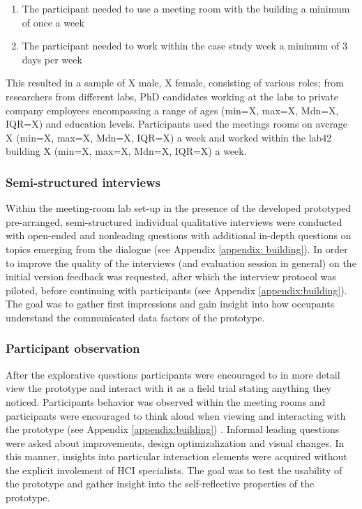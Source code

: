 \begin{enumerate}
    \renewcommand{\labelenumi}{C\arabic{enumi}:}
    \item The participant needed to use a meeting room with the building a minimum of once a week
    \item The participant needed to work within the case study week a minimum of 3 days per week
\end{enumerate}

This resulted in a sample of X male, X female, consisting of various roles; from researchers from different labs, PhD candidates working at the labs to private company employees encompassing a range of ages (min=X, max=X, Mdn=X, IQR=X) and education levels. Participants used the meetings rooms on average X (min=X, max=X, Mdn=X, IQR=X) a week and worked within the lab42 building X (min=X, max=X, Mdn=X, IQR=X) a week.

\subsubsection{Semi-structured interviews}

Within the meeting-room lab set-up in the presence of the developed prototyped pre-arranged, semi-structured individual qualitative interviews were conducted with open-ended and nonleading questions with additional in-depth questions on topics emerging from the
dialogue (see Appendix \ref{appendix: building}). In order to improve the quality of the interviews (and evaluation session in general) on the initial version feedback was requested, after which the interview protocol was piloted, before continuing with participants (see Appendix \ref{appendix:building}). The goal was to gather first impressions and gain insight into how occupants understand the communicated data factors of the prototype.

\subsubsection{Participant observation}

After the explorative questions participants were encouraged to in more detail view the prototype and interact with it as a field trial stating anything they noticed. Participants behavior was observed within the meeting rooms and participants were encouraged to think aloud when viewing and interacting with the prototype (see Appendix \ref{appendix:building}) . Informal leading questions were asked about improvements, design optimizalization and visual changes. In this manner, insights into particular interaction elements were acquired without the explicit involement of HCI specialists. The goal was to test the usability of the prototype and gather insight into the self-reflective properties of the prototype. 

